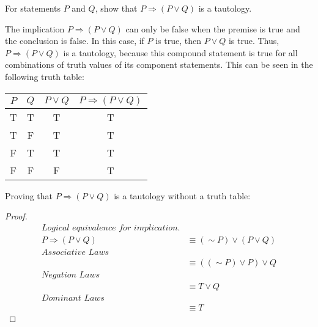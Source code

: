 \documentclass[12pt]{article}
\newenvironment{problem}[2][Problem]{\begin{trivlist}
		\item[\hskip \labelsep {\bfseries #1}\hskip \labelsep {\bfseries #2.}]}{\end{trivlist}}
\newenvironment{solution}[2][Solution]{\begin{trivlist}
		\item[\hskip \labelsep {\bfseries #1}\hskip \labelsep {\bfseries #2.}]}{\end{trivlist}}
\begin{document}
\begin{problem}{46}
	For statements $P$ and $Q$, show that $P \Rightarrow (P\vee Q)$ is a tautology.
	\begin{solution}{}
		The implication $P \Rightarrow (P\vee Q)$ can only be false when the premise is true and the conclusion is false. In this case, if $P$ is true, then $P\vee Q$ is true. Thus, $P \Rightarrow (P\vee Q)$ is a tautology, because this compound statement is true for all combinations of truth values of its component statements. This can be seen in the following truth table:
		\begin{center}
			\begin{tabular}{c c c c}
				$P$ & $Q$ & $P \vee Q$ & $P \Rightarrow (P \vee Q)$\\
				\hline
				T & T & T & T\\
				T & F & T & T\\
				F & T & T & T\\
				F & F & F & T\\
				\hline
	
			\end{tabular}
		\end{center}
 \noindent Proving that $P \Rightarrow (P\vee Q)$ is a tautology without a truth table:\\
 \begin{proof}
 	\begin{align*}
 		\textit{Logical equivalence for implication.}\\
 		P \Rightarrow (P \vee Q) & \equiv (\sim P) \vee (P \vee Q)\\
 		\textit{Associative Laws}\\
 		& \equiv ((\sim P) \vee P)\vee Q\\
 		\textit{Negation Laws}\\
 		& \equiv T \vee Q\\
 		\textit{Dominant Laws}\\
 		& \equiv T 
 	\end{align*}
 \end{proof}
	\end{solution}
\end{problem}
\end{document}
